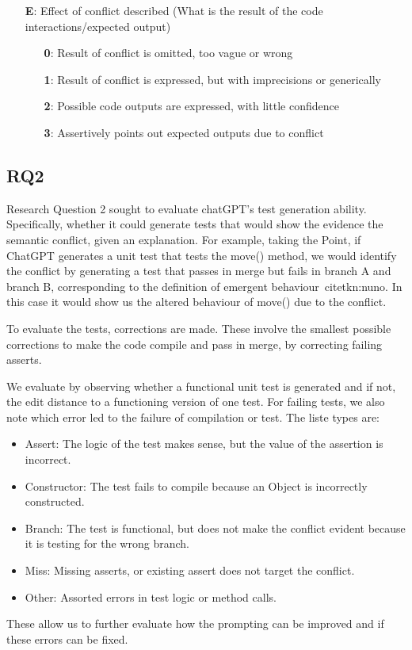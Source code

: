 \begin{itemize}
  \item[\textbf{E}:] Effect of conflict described (What is the result of the code interactions/expected output)
  \begin{itemize}
    \item[\textbf{0}:] Result of conflict is omitted, too vague or wrong
    \item[\textbf{1}:] Result of conflict is expressed, but with imprecisions or generically
    \item[\textbf{2}:] Possible code outputs are expressed, with little confidence
    \item[\textbf{3}:] Assertively points out expected outputs due to conflict
  \end{itemize}
\end{itemize}


\subsection{RQ2}

Research Question 2 sought to evaluate chatGPT's test generation ability. Specifically, whether it could generate tests that would show the evidence the semantic conflict, given an explanation.
For example, taking the Point, if ChatGPT generates a unit test that tests the move() method, we would identify the conflict by generating a test that passes in merge but fails in branch A and branch B, corresponding to the definition of emergent behaviour~citet{kn:nuno}.
In this case it would show us the altered behaviour of move() due to the conflict.

To evaluate the tests, corrections are made. These involve the smallest possible corrections to make the code compile and pass in merge, by correcting failing asserts.

We evaluate by observing whether a functional unit test is generated and if not, the edit distance to a functioning version of one test. For failing tests, we also note which error led to the failure of compilation or test. The liste types are:
\begin{itemize}
  \item Assert: The logic of the test makes sense, but the value of the assertion is incorrect.
  \item Constructor: The test fails to compile because an Object is incorrectly constructed.
  \item Branch: The test is functional, but does not make the conflict evident because it is testing for the wrong branch.
  \item Miss: Missing asserts, or existing assert does not target the conflict.
  \item Other: Assorted errors in test logic or method calls.
\end{itemize}
These allow us to further evaluate how the prompting can be improved and if these errors can be fixed.

